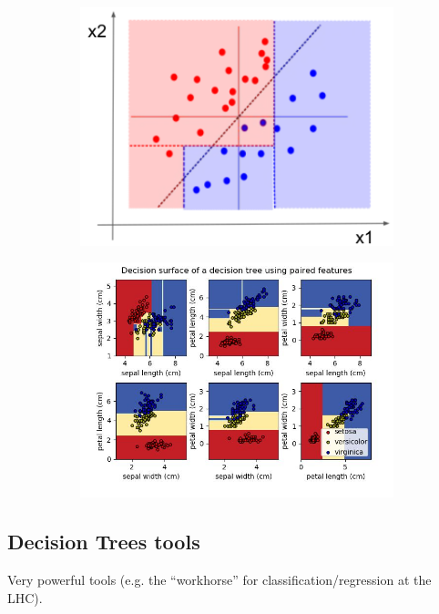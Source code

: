 \begin{figure}[ht]
	\centering
	\begin{subfigure}{.4\textwidth}
		\centering
		\includegraphics[width=0.9\linewidth]{figure_ml/limitations_trees.png}
	\end{subfigure}%
	\begin{subfigure}{.6\textwidth}
		\centering
		\includegraphics[width=0.9\linewidth]{figure_ml/limitations_trees2.png}
	\end{subfigure}
\end{figure}
\FloatBarrier


\subsection{Decision Trees tools}
Very powerful tools (e.g. the “workhorse” for classification/regression at the LHC).\\

